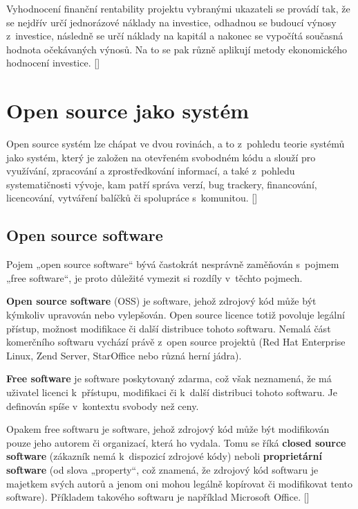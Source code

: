 \documentclass[
	11pt, oneside, printed, final, palatino, monochrome
	microtype,
	table,   %
	lof,     %
	lot     %
]{fithesis3}
\newcommand{\citepages}[2]{[\cite[#1]{#2}]}
\newcommand{\citesource}[1]{[\cite{#1}]}
\newcommand{\bold}[1]{\textbf{#1}}
\begin{document}
{Vyhodnocení finanční rentability projektu vybranými ukazateli se provádí tak, že se nejdřív určí jednorázové náklady na investice, odhadnou se budoucí výnosy z~investice, následně se určí náklady na kapitál a nakonec se vypočítá současná hodnota očekávaných výnosů. Na to se pak různě aplikují metody ekonomického hodnocení investice. \citepages{17-18}{Podesvova2010thesis}

\section{Open source jako systém}
Open source systém lze chápat ve dvou rovinách, a to z~pohledu teorie systémů jako systém, který je založen na otevřeném svobodném kódu a slouží pro využívání, zpracování a zprostředkování informací, a také z~pohledu systematičnosti vývoje, kam patří správa verzí, bug trackery, financování, licencování, vytváření balíčků či spolupráce s~komunitou. \citepages{40}{cejpek_2005}

\subsection{Open source software}

Pojem „open source software“ bývá častokrát nesprávně zaměňován s~pojmem „free software“, je proto důležité vymezit si rozdíly v~těchto pojmech. 

\bold{Open source software} (OSS) je software, jehož zdrojový kód může být kýmkoliv upravován nebo vylepšován. Open source licence totiž povoluje legální přístup, možnost modifikace či další distribuce tohoto softwaru. Nemalá část komerčního softwaru vychází právě z~open source projektů (Red Hat Enterprise Linux, Zend Server, StarOffice nebo různá herní jádra).

\bold{Free software} je software poskytovaný zdarma, což však neznamená, že má uživatel licenci k~přístupu, modifikaci či k~další distribuci tohoto softwaru. Je definován spíše v~kontextu svobody než ceny. 

Opakem free softwaru je software, jehož zdrojový kód může být modifikován pouze jeho autorem či organizací, která ho vydala. Tomu se říká \bold{closed source software} (zákazník nemá k~dispozicí zdrojové kódy) neboli \bold{proprietární software} (od slova „property“, což znamená, že zdrojový kód softwaru je majetkem svých autorů a jenom oni mohou legálně kopírovat či modifikovat tento software). Příkladem takového softwaru je například Microsoft Office. \citesource{mclean}

}
\end{document}
